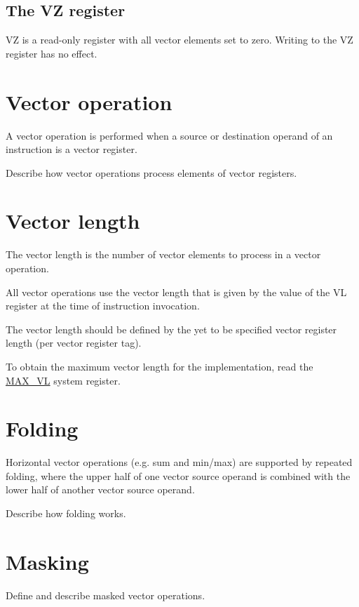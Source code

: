 \subsection{The VZ register}

VZ is a read-only register with all vector elements set to zero. Writing to the
VZ register has no effect.

\section{Vector operation}

A vector operation is performed when a source or destination operand of an
instruction is a vector register.

\begin{todobox}
  Describe how vector operations process elements of vector registers.
\end{todobox}

\section{Vector length}

The vector length is the number of vector elements to process in a vector
operation.

All vector operations use the vector length that is given by the value of the
VL register at the time of instruction invocation.

\begin{todobox}
  The vector length should be defined by the yet to be specified vector
  register length (per vector register tag).
\end{todobox}

To obtain the maximum vector length for the implementation, read the
\hyperref[reg:MAX_VL]{MAX\_VL} system register.

\section{Folding}

Horizontal vector operations (e.g. sum and min/max) are supported by repeated
folding, where the upper half of one vector source operand is combined with the
lower half of another vector source operand.

\begin{todobox}
  Describe how folding works.
\end{todobox}

\section{Masking}

\begin{todobox}
  Define and describe masked vector operations.
\end{todobox}
